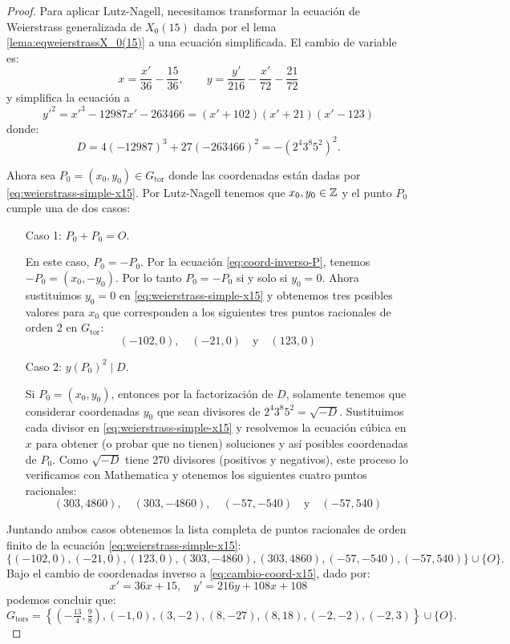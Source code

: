 \documentclass[../../tesis_maestria]{subfiles}
\begin{document}
\begin{proof}
Para aplicar Lutz-Nagell, necesitamos transformar la ecuación de Weierstrass generalizada de $X_0(15)$ dada por el lema \ref{lema:eqweierstrassX_0(15)} a una ecuación simplificada. El cambio de variable es:
\begin{equation}\label{eq:cambio-coord-x15}
	x=\frac{x'}{36}-\frac{15}{36},\qquad y=\frac{y'}{216}-\frac{x'}{72}-\frac{21}{72}
\end{equation}
y simplifica la ecuación a
\begin{equation}\label{eq:weierstrass-simple-x15}
	y'^2=x'^3-12987x'-263466=(x'+102)(x'+21)(x'-123)
\end{equation}
donde:
\[
	D=4(-12987)^3+27(-263466)^2=-(2^4 3^8 5^2)^2.
\]

Ahora sea $P_0=(x_0,y_0)\in G_\mathrm{tor}$ donde las coordenadas están dadas por \eqref{eq:weierstrass-simple-x15}. Por Lutz-Nagell tenemos que $x_0,y_0\in\mathbb{Z}$ y el punto $P_0$ cumple una de dos casos:
\begin{enumerate}
	\item[Caso 1:] $P_0+P_0=O$.
	
	En este caso, $P_0=-P_0$. Por la ecuaci\'on \eqref{eq:coord-inverso-P}, tenemos $-P_0=(x_0,-y_0)$. Por lo tanto $P_0=-P_0$ si y solo si $y_0=0$. Ahora sustituimos $y_0=0$ en \eqref{eq:weierstrass-simple-x15} y obtenemos tres posibles valores para $x_0$ que corresponden a los siguientes tres puntos racionales de orden 2 en $G_\mathrm{tor}$:
\[
	(-102,0),\quad (-21,0)\quad\text{y}\quad (123,0)
\]
	\item[Caso 2:] $y(P_0)^2\mid D$.
	
	Si $P_0=(x_0,y_0)$, entonces por la factorización de $D$, solamente tenemos que considerar coordenadas $y_0$ que sean divisores de $2^4 3^8 5^2=\sqrt{-D}$. Sustituimos cada divisor en \eqref{eq:weierstrass-simple-x15} y resolvemos la ecuación cúbica en $x$ para obtener (o probar que no tienen) soluciones y así posibles coordenadas de $P_0$. Como $\sqrt{-D}$ tiene 270 divisores (positivos y negativos), este proceso lo verificamos con Mathematica y otenemos los siguientes cuatro puntos racionales:
	\[
		(303,4860),\quad (303,-4860),\quad (-57,-540)\quad\text{y}\quad (-57,540)
	\]
\end{enumerate}

Juntando ambos casos obtenemos la lista completa de puntos racionales de orden finito de la ecuación \eqref{eq:weierstrass-simple-x15}:
\[
	\{(-102,0),(-21,0),(123,0),(303,-4860),(303,4860),(-57,-540),(-57,540)\}\cup\{O\}.
\]
Bajo el cambio de coordenadas inverso a \eqref{eq:cambio-coord-x15}, dado por:
\[
	x'=36x+15,\quad y'=216y+108x+108
\]
podemos concluir que:
	\[
		G_\mathrm{tors}=
		\left\{ \left(-\tfrac{13}{4},\tfrac{9}{8}\right),(-1,0),(3,-2),(8,-27),(8,18),(-2,-2),(-2,3) \right\}\cup\{O\}.
	\]
\end{proof}
\end{document}
